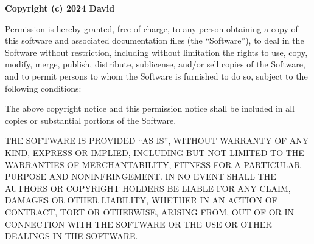 \documentclass{article}
\begin{document}
\noindent\textbf{Copyright (c) 2024 David}

\bigskip

\noindent Permission is hereby granted, free of charge, to any person obtaining a copy
of this software and associated documentation files (the ``Software''), to deal
in the Software without restriction, including without limitation the rights
to use, copy, modify, merge, publish, distribute, sublicense, and/or sell
copies of the Software, and to permit persons to whom the Software is
furnished to do so, subject to the following conditions:

\medskip

\noindent The above copyright notice and this permission notice shall be included in all
copies or substantial portions of the Software.

\medskip

\noindent THE SOFTWARE IS PROVIDED ``AS IS'', WITHOUT WARRANTY OF ANY KIND, EXPRESS OR
IMPLIED, INCLUDING BUT NOT LIMITED TO THE WARRANTIES OF MERCHANTABILITY,
FITNESS FOR A PARTICULAR PURPOSE AND NONINFRINGEMENT. IN NO EVENT SHALL THE
AUTHORS OR COPYRIGHT HOLDERS BE LIABLE FOR ANY CLAIM, DAMAGES OR OTHER
LIABILITY, WHETHER IN AN ACTION OF CONTRACT, TORT OR OTHERWISE, ARISING FROM,
OUT OF OR IN CONNECTION WITH THE SOFTWARE OR THE USE OR OTHER DEALINGS IN THE
SOFTWARE.
\end{document}

